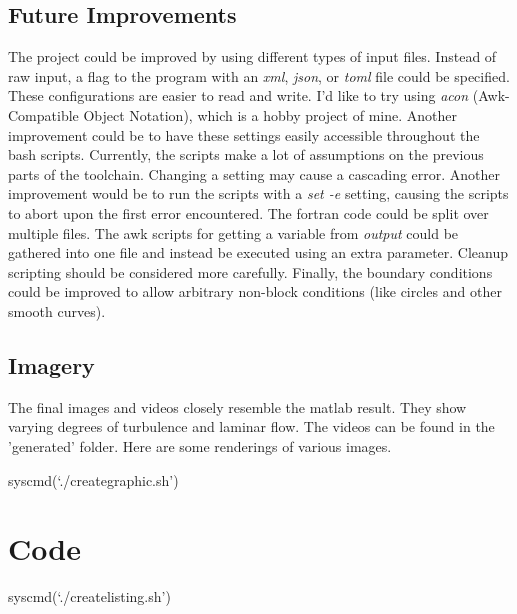 \documentclass[listof=totoc]{report}
\begin{document}
\section{Future Improvements}
The project could be improved by using different types of input files. Instead of raw input, a flag to the program with an \emph{xml}, \emph{json}, or \emph{toml} file could be specified. These configurations are easier to read and write. I'd like to try using \emph{acon} (Awk-Compatible Object Notation), which is a hobby project of mine.
Another improvement could be to have these settings easily accessible throughout the bash scripts. Currently, the scripts make a lot of assumptions on the previous parts of the toolchain. Changing a setting may cause a cascading error. Another improvement would be to run the scripts with a \emph{set -e} setting, causing the scripts to abort upon the first error encountered. The fortran code could be split over multiple files. The awk scripts for getting a variable from \emph{output} could be gathered into one file and instead be executed using an extra parameter. Cleanup scripting should be considered more carefully. Finally, the boundary conditions could be improved to allow arbitrary non-block conditions (like circles and other smooth curves).

\section{Imagery}
The final images and videos closely resemble the matlab result. They show varying degrees of turbulence and laminar flow.
The videos can be found in the 'generated' folder.
Here are some renderings of various images.

syscmd(`./creategraphic.sh')

\chapter{Code}
syscmd(`./createlisting.sh')
\end{document}
